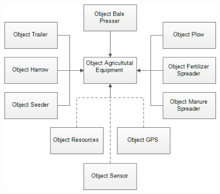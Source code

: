 \begin{figure}[ht]
    \centering
    \includegraphics{images/cluster_diagram_agricultural_equipment}
    \caption{}
    \label{fig:cluster_equipment}
\end{figure}



